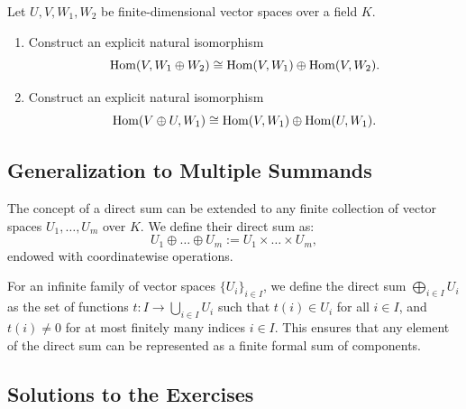 \begin{exercise}
\label{exc:hom_direct_sum_decompositions}
Let $U, V, W_1, W_2$ be finite-dimensional vector spaces over a field $K$.
\begin{enumerate}
    \item Construct an explicit natural isomorphism
    \[
    \operatorname{Hom}(V, W_1 \oplus W_2) \cong \operatorname{Hom}(V, W_1) \oplus \operatorname{Hom}(V, W_2).
    \]
    \item Construct an explicit natural isomorphism
    \[
    \operatorname{Hom}(V \oplus U, W_1) \cong \operatorname{Hom}(V, W_1) \oplus \operatorname{Hom}(U, W_1).
    \]
\end{enumerate}
\end{exercise}

\subsection{Generalization to Multiple Summands}

The concept of a direct sum can be extended to any finite collection of vector spaces $U_1, \dots, U_m$ over $K$. We define their direct sum as:
\[
U_1 \oplus \dots \oplus U_m := U_1 \times \dots \times U_m,
\]
endowed with coordinatewise operations.

For an infinite family of vector spaces $\{U_i\}_{i \in I}$, we define the direct sum $\bigoplus_{i \in I} U_i$ as the set of functions $t \colon I \to \bigcup_{i \in I} U_i$ such that $t(i) \in U_i$ for all $i \in I$, and $t(i) \neq 0$ for at most finitely many indices $i \in I$. This ensures that any element of the direct sum can be represented as a finite formal sum of components.

\subsection{Solutions to the Exercises}
\label{sec:solutions_direct_sums}

